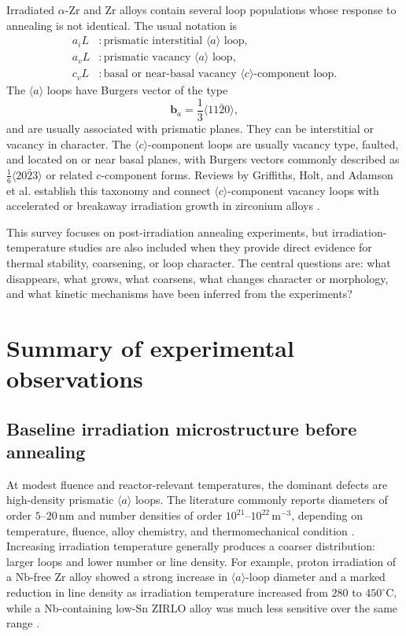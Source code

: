 \documentclass[11pt]{article}
\newcommand{\aiL}{a_iL}
\newcommand{\avL}{a_vL}
\newcommand{\cvL}{c_vL}
\newcommand{\degreeC}{^\circ\mathrm{C}}
\begin{document}
Irradiated $\alpha$-Zr and Zr alloys contain several loop populations whose response to annealing is not identical.  The usual notation is
\begin{align}
\aiL &: \text{prismatic interstitial }\langle a\rangle\text{ loop},\\
\avL &: \text{prismatic vacancy }\langle a\rangle\text{ loop},\\
\cvL &: \text{basal or near-basal vacancy }\langle c\rangle\text{-component loop}.
\end{align}
The $\langle a\rangle$ loops have Burgers vector of the type
\begin{equation}
  \bm b_a=\frac{1}{3}\langle 11\bar{2}0\rangle,
\end{equation}
and are usually associated with prismatic planes.  They can be interstitial or vacancy in character.  The $\langle c\rangle$-component loops are usually vacancy type, faulted, and located on or near basal planes, with Burgers vectors commonly described as $\frac{1}{6}\langle20\bar{2}3\rangle$ or related $c$-component forms.  Reviews by Griffiths, Holt, and Adamson et al. establish this taxonomy and connect $\langle c\rangle$-component vacancy loops with accelerated or breakaway irradiation growth in zirconium alloys \citep{Griffiths1988,Holt1988,Adamson2019}.

This survey focuses on post-irradiation annealing experiments, but irradiation-temperature studies are also included when they provide direct evidence for thermal stability, coarsening, or loop character.  The central questions are: what disappears, what grows, what coarsens, what changes character or morphology, and what kinetic mechanisms have been inferred from the experiments?

\section{Summary of experimental observations}

\subsection{Baseline irradiation microstructure before annealing}

At modest fluence and reactor-relevant temperatures, the dominant defects are high-density prismatic $\langle a\rangle$ loops.  The literature commonly reports diameters of order $5$--$20\,\mathrm{nm}$ and number densities of order $10^{21}$--$10^{22}\,\mathrm{m^{-3}}$, depending on temperature, fluence, alloy chemistry, and thermomechanical condition \citep{Jostsons1977,Northwood1979,Gilbert1979,Griffiths1988,Christiaen2019}.  Increasing irradiation temperature generally produces a coarser distribution: larger loops and lower number or line density.  For example, proton irradiation of a Nb-free Zr alloy showed a strong increase in $\langle a\rangle$-loop diameter and a marked reduction in line density as irradiation temperature increased from $280$ to $450\degreeC$, while a Nb-containing low-Sn ZIRLO alloy was much less sensitive over the same range \citep{Harte2017}.
\end{document}
